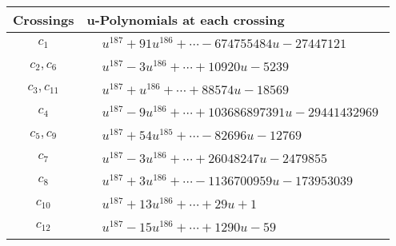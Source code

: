 \documentclass[1p]{elsarticle_modified}
\theoremstyle{definition}
\begin{document}
\begin{tabular}{m{50pt}|m{274pt}}
Crossings & \hspace{64pt}u-Polynomials at each crossing \\
\hline $$\begin{aligned}c_{1}\end{aligned}$$&$\begin{aligned}
&u^{187}+91 u^{186}+\cdots-674755484 u-27447121
\end{aligned}$\\
\hline $$\begin{aligned}c_{2},c_{6}\end{aligned}$$&$\begin{aligned}
&u^{187}-3 u^{186}+\cdots+10920 u-5239
\end{aligned}$\\
\hline $$\begin{aligned}c_{3},c_{11}\end{aligned}$$&$\begin{aligned}
&u^{187}+u^{186}+\cdots+88574 u-18569
\end{aligned}$\\
\hline $$\begin{aligned}c_{4}\end{aligned}$$&$\begin{aligned}
&u^{187}-9 u^{186}+\cdots+103686897391 u-29441432969
\end{aligned}$\\
\hline $$\begin{aligned}c_{5},c_{9}\end{aligned}$$&$\begin{aligned}
&u^{187}+54 u^{185}+\cdots-82696 u-12769
\end{aligned}$\\
\hline $$\begin{aligned}c_{7}\end{aligned}$$&$\begin{aligned}
&u^{187}-3 u^{186}+\cdots+26048247 u-2479855
\end{aligned}$\\
\hline $$\begin{aligned}c_{8}\end{aligned}$$&$\begin{aligned}
&u^{187}+3 u^{186}+\cdots-1136700959 u-173953039
\end{aligned}$\\
\hline $$\begin{aligned}c_{10}\end{aligned}$$&$\begin{aligned}
&u^{187}+13 u^{186}+\cdots+29 u+1
\end{aligned}$\\
\hline $$\begin{aligned}c_{12}\end{aligned}$$&$\begin{aligned}
&u^{187}-15 u^{186}+\cdots+1290 u-59
\end{aligned}$\\
\hline
\end{tabular}\\~\\
\end{document}
